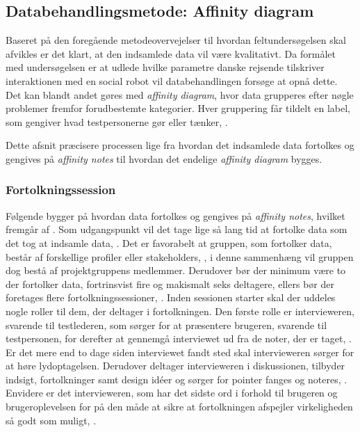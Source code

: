 \subsection{Databehandlingsmetode: Affinity diagram}
\label{ParametreMetodeovervejelserAffinityDiagram}
%
Baseret på den foregående metodeovervejelser til hvordan feltundersøgelsen skal afvikles er det klart, at den indsamlede data vil være kvalitativt. Da formålet med undersøgelsen er at udlede hvilke parametre danske rejsende tilskriver interaktionen med en social robot vil databehandlingen forsøge at opnå dette. Det kan blandt andet gøres med \textit{affinity diagram}, hvor data grupperes efter nøgle problemer fremfor forudbestemte kategorier. Hver gruppering får tildelt en label, som gengiver hvad testpersonerne gør eller tænker, \parencite[s. 159]{Book:BuildingAnAffinity}. 

Dette afsnit præcisere processen lige fra hvordan det indsamlede data fortolkes og gengives på \textit{affinity notes} til hvordan det endelige \textit{affinity diagram} bygges.

\subsubsection{Fortolkningssession}
\label{ParametreFortolkningssession}
%
Følgende bygger på hvordan data fortolkes og gengives på \textit{affinity notes}, hvilket fremgår af \textcite[ss. 101-122]{Book:CIInterpretationSession}. Som udgangspunkt vil det tage lige så lang tid at fortolke data som det tog at indsamle data, \parencite[s. 102]{Book:CIInterpretationSession}. Det er favorabelt at gruppen, som fortolker data, består af forskellige profiler eller stakeholders, \parencite[s. 104]{Book:CIInterpretationSession}, i denne sammenhæng vil gruppen dog bestå af projektgruppens medlemmer. Derudover bør der minimum være to der fortolker data, fortrinsvist fire og makismalt seks deltagere, ellers bør der foretages flere fortolkningssessioner, \parencite[s. 104]{Book:CIInterpretationSession}. \blankline
%
Inden sessionen starter skal der uddeles nogle roller til dem, der deltager i fortolkningen. Den første rolle er intervieweren, svarende til testlederen, som sørger for at præsentere brugeren, svarende til testpersonen, for derefter at gennemgå interviewet ud fra de noter, der er taget, \parencite[ss. 106-107]{Book:CIInterpretationSession}. Er det mere end to dage siden interviewet fandt sted skal intervieweren sørger for at høre lydoptagelsen. Derudover deltager intervieweren i diskussionen, tilbyder indsigt, fortolkninger samt design idéer og sørger for pointer fanges og noteres, \parencite[s. 107]{Book:CIInterpretationSession}. Envidere er det intervieweren, som har det sidste ord i forhold til brugeren og brugeroplevelsen for på den måde at sikre at fortolkningen afspejler virkeligheden så godt som muligt, \parencite[s. 107]{Book:CIInterpretationSession}.

